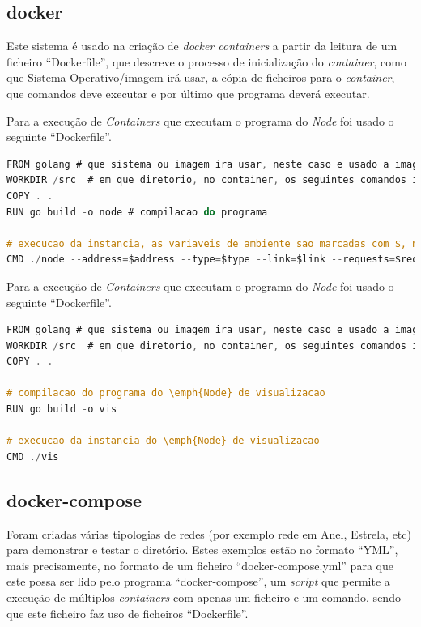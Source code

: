 \subsection*{docker}
\label{validacao:subsec:docker}
Este sistema é usado na criação de \emph{docker containers} a partir da leitura de um ficheiro ``Dockerfile'', que descreve o processo de inicialização do \emph{container}, como que Sistema Operativo/imagem irá usar, a cópia de ficheiros para o \emph{container}, que comandos deve executar e por último que programa deverá executar.


Para a execução de \emph{Containers} que executam o programa do \emph{Node} foi usado o seguinte ``Dockerfile''.
\begin{lstlisting}[caption={``Dockerfile'' do \emph{Node}},language=C]
FROM golang # que sistema ou imagem ira usar, neste caso e usado a imagem ``golang''
WORKDIR /src  # em que diretorio, no container, os seguintes comandos irao ser executados
COPY . .
RUN go build -o node # compilacao do programa

# execucao da instancia, as variaveis de ambiente sao marcadas com $, no entanto serao descritas a sua origem de seguida
CMD ./node --address=$address --type=$type --link=$link --requests=$requests --visualization=$VIS_ADDRESS
\end{lstlisting}
 
Para a execução de \emph{Containers} que executam o programa do \emph{Node} foi usado o seguinte ``Dockerfile''.
\begin{lstlisting}[caption={``Dockerfile'' do \emph{Node}},language=C]
FROM golang # que sistema ou imagem ira usar, neste caso e usado a imagem ``golang''
WORKDIR /src  # em que diretorio, no container, os seguintes comandos irao ser executados
COPY . .

# compilacao do programa do \emph{Node} de visualizacao
RUN go build -o vis

# execucao da instancia do \emph{Node} de visualizacao
CMD ./vis

\end{lstlisting}

\subsection*{docker-compose}

Foram criadas várias tipologias de redes (por exemplo rede em Anel, Estrela, etc) para demonstrar e testar o diretório.
Estes exemplos estão no formato ``YML'', mais precisamente, no formato de um ficheiro ``docker-compose.yml'' para que este possa ser lido pelo programa ``docker-compose'', um \emph{script} que permite a execução de múltiplos \emph{containers} com apenas um ficheiro e um comando, sendo que este ficheiro faz uso de ficheiros ``Dockerfile''.

